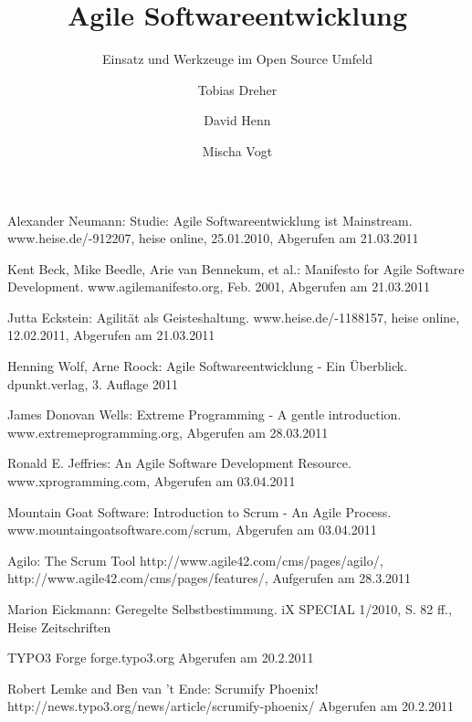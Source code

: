 \documentclass[german,english]{header}
\begin{document}

\title{Agile Softwareentwicklung}
\subtitle{Einsatz und Werkzeuge im Open Source Umfeld}
\author{Tobias Dreher\and David Henn\and Mischa Vogt}

\maketitle







\begin{thebibliography}{5}
Alexander Neumann:
Studie: Agile Softwareentwicklung ist Mainstream.
www.heise.de/-912207, heise online, 25.01.2010, Abgerufen am 21.03.2011

Kent Beck, Mike Beedle, Arie van Bennekum, et al.: 
Manifesto for Agile Software Development.
www.agilemanifesto.org, Feb. 2001, Abgerufen am 21.03.2011

Jutta Eckstein: 
Agilität als Geisteshaltung.
www.heise.de/-1188157, heise online, 12.02.2011, Abgerufen am 21.03.2011

Henning Wolf, Arne Roock: 
Agile Softwareentwicklung - Ein Überblick.
dpunkt.verlag, 3. Auflage 2011

James Donovan Wells: 
Extreme Programming - A gentle introduction.
www.extremeprogramming.org, Abgerufen am 28.03.2011

Ronald E. Jeffries: 
An Agile Software Development Resource.
www.xprogramming.com, Abgerufen am 03.04.2011

Mountain Goat Software: 
Introduction to Scrum - An Agile Process.
www.mountaingoatsoftware.com/scrum, Abgerufen am 03.04.2011

Agilo: The Scrum Tool
http://www.agile42.com/cms/pages/agilo/,
http://www.agile42.com/cms/pages/features/,
Aufgerufen am 28.3.2011

Marion Eickmann: 
Geregelte Selbstbestimmung.
iX SPECIAL 1/2010, S. 82 ff., Heise Zeitschriften

TYPO3 Forge
forge.typo3.org Abgerufen am 20.2.2011

Robert Lemke and Ben van 't Ende:
Scrumify Phoenix!
http://news.typo3.org/news/article/scrumify-phoenix/ Abgerufen am 20.2.2011


\end{thebibliography}
\end{document}

